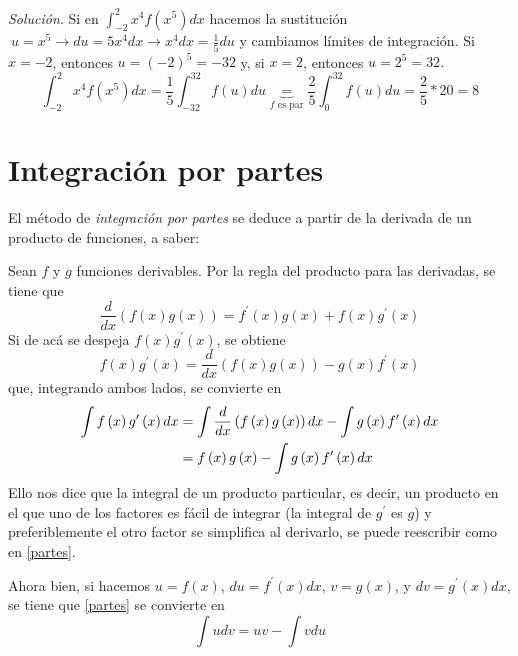 \textit{Solución}. Si en {\footnotesize $\displaystyle{\int_{-2}^{2}x^{4}f\left( x^{5}\right) dx}$} hacemos la sustitución $\ u=x^{5}\rightarrow du=5x^{4}dx\rightarrow x^{4}dx=\frac{1}{5}du$ y cambiamos límites de integración. Si $x=-2$, entonces {\footnotesize $u=\left( -2\right)^{5}=-32$} y, si $x=2$, entonces {\footnotesize $u=2^{5}=32$.}
\[
\int_{-2}^{2}x^{4}f\left( x^{5}\right) dx=\frac{1}{5}\int_{-32}^{32}f\left(
u\right) du\underset{f\text{ es par}}{\underbrace{=}}\frac{2}{5}%
\int_{0}^{32}f\left( u\right) du=\frac{2}{5}\ast 20=8
\]

\section{Integración por partes}

El método de \textit{integración por partes} se deduce a partir de la derivada de un producto de funciones, a saber:

Sean $f$ y $g$ funciones derivables. Por la regla del producto para las derivadas, se tiene que
\[
\frac{d}{dx}\left( f\left( x\right) g\left( x\right) \right) =f^{\prime}\left(
x\right) g\left( x\right) +f\left( x\right) g^{\prime}\left( x\right)
\]
Si de acá se despeja $f\left( x\right) g^{\prime}\left( x\right) $, se obtiene
\[
f\left( x\right) g^{\prime}\left( x\right) =\frac{d}{dx}\left( f\left( x\right)g\left( x\right) \right) -g\left( x\right) f^{\prime}\left( x\right)
\]
que, integrando ambos lados, se convierte en
\begin{align}\label{partes}
\int f\left( x\right) g^{\prime}\left( x\right) dx&=\int \frac{d}{dx}\left(
f\left( x\right) g\left( x\right) \right) dx-\int g\left( x\right)
f^{\prime}\left( x\right) dx\notag\\
&=f\left( x\right) g\left(
x\right) -\int g\left( x\right) f^{\prime}\left( x\right) dx
\end{align}
Ello nos dice que la integral de un producto particular, es decir, un producto en el que uno de los factores es fácil de integrar (la integral de $g^\prime$ es $g$) y preferiblemente el otro factor se simplifica al derivarlo, se puede reescribir como en \eqref{partes}.

Ahora bien, si hacemos $u=f\left( x\right)$, $du=f^{\prime}\left( x\right)
dx$, $v=g\left( x\right)$, y $dv=g^{\prime}\left( x\right) dx$, se tiene que \eqref{partes} se convierte en
\begin{equation}\label{partesformula}
\int udv=uv-\int vdu
\end{equation}

